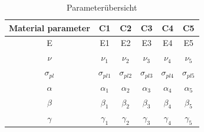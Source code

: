     \begin{table}[h!]
        \centering
        \begin{tabular}{cccccc}
        \toprule
        Material parameter & C1 & C2 & C3 & C4 & C5 \\
        \midrule
        E     & E1     & E2     & E3     & E4     & E5 \\
        \hline
        $\nu$ & $\nu_1$ & $\nu_2$ & $\nu_3$ & $\nu_4$ & $\nu_5$ \\
        $\sigma_{pl}$ & $\sigma_{pl1}$ & $\sigma_{pl2}$ & $\sigma_{pl3}$ & $\sigma_{pl4}$ & $\sigma_{pl5}$ \\
        $\alpha$ & $\alpha_1$ & $\alpha_2$ & $\alpha_3$ & $\alpha_4$ & $\alpha_5$ \\
        $\beta$  & $\beta_1$ & $\beta_2$ & $\beta_3$ & $\beta_4$ & $\beta_5$ \\
        $\gamma$ & $\gamma_1$ & $\gamma_2$ & $\gamma_3$ & $\gamma_4$ & $\gamma_5$ \\
        \bottomrule
        \end{tabular}
        \caption{Parameterübersicht}
    \end{table}

